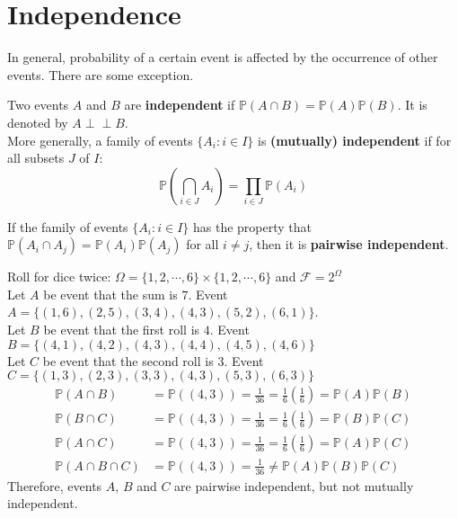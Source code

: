 \documentclass{huhtakm-template-book}
\newcommand{\independent}{\perp\!\!\!\perp}
\newcommand{\prob}{\mathbb{P}}
\begin{document}
\section{Independence}
    In general, probability of a certain event is affected by the occurrence of other events. There are some exception.
    \begin{defn}
        Two events $A$ and $B$ are \textbf{independent} if $\prob(A\cap B)=\prob(A)\prob(B)$. It is denoted by $A\independent B$.\\
        More generally, a family of events $\{A_{i}:i\in I\}$ is \textbf{(mutually) independent} if for all subsets $J$ of $I$:
        \begin{equation*}
            \prob\left(\bigcap_{i\in J}A_{i}\right)=\prod_{i\in J}\prob(A_{i})
        \end{equation*}
    \end{defn}
    \begin{rem}
        If the family of events $\{A_{i}:i\in I\}$ has the property that $\prob(A_{i}\cap A_{j})=\prob(A_{i})\prob(A_{j})$ for all $i\neq j$, then it is \textbf{pairwise independent}.
    \end{rem}
    \begin{eg}
        Roll for dice twice: $\Omega=\{1,2,\cdots,6\}\times\{1,2,\cdots,6\}$ and $\mathcal{F}=2^{\Omega}$\\
        Let $A$ be event that the sum is $7$. Event $A=\{(1,6),(2,5),(3,4),(4,3),(5,2),(6,1)\}$.\\
        Let $B$ be event that the first roll is $4$. Event $B=\{(4,1),(4,2),(4,3),(4,4),(4,5),(4,6)\}$\\
        Let $C$ be event that the second roll is $3$. Event $C=\{(1,3),(2,3),(3,3),(4,3),(5,3),(6,3)\}$
        \begin{align*}
            \prob(A\cap B)&=\prob((4,3))=\frac{1}{36}=\frac{1}{6}\left(\frac{1}{6}\right)=\prob(A)\prob(B)\\
            \prob(B\cap C)&=\prob((4,3))=\frac{1}{36}=\frac{1}{6}\left(\frac{1}{6}\right)=\prob(B)\prob(C)\\
            \prob(A\cap C)&=\prob((4,3))=\frac{1}{36}=\frac{1}{6}\left(\frac{1}{6}\right)=\prob(A)\prob(C)\\
            \prob(A\cap B\cap C)&=\prob((4,3))=\frac{1}{36}\neq\prob(A)\prob(B)\prob(C)
        \end{align*}
        Therefore, events $A$, $B$ and $C$ are pairwise independent, but not mutually independent.
    \end{eg}
\end{document}
